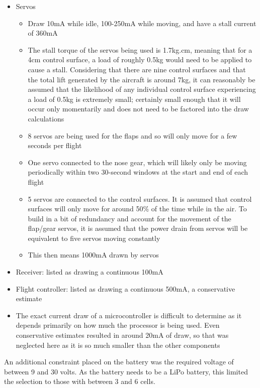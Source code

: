 \documentclass[../../main.tex]{subfiles}
\begin{document}
\begin{itemize}
    \item Servos
        \begin{itemize}
            \item Draw 10mA while idle, 100-250mA while moving, and have a stall current of 360mA 
            \item The stall torque of the servos being used is 1.7kg.cm, meaning that for a 4cm control surface, a load of roughly 0.5kg would need to be applied to cause a stall.
                Considering that there are nine control surfaces and that the total lift generated by the aircraft is around 7kg, it can reasonably be assumed that the likelihood of any individual control surface experiencing a load of 0.5kg is extremely small; certainly small enough that it will occur only momentarily and does not need to be factored into the draw calculations 
            \item 8 servos are being used for the flaps and so will only move for a few seconds per flight 
            \item One servo connected to the nose gear, which will likely only be moving periodically within two 30-second windows at the start and end of each flight 
            \item 5 servos are connected to the control surfaces.
                It is assumed that control surfaces will only move for around 50\% of the time while in the air.
                To build in a bit of redundancy and account for the movement of the flap/gear servos, it is assumed that the power drain from servos will be equivalent to five servos moving constantly 
            \item This then means 1000mA drawn by servos 
        \end{itemize}
    \item Receiver: listed as drawing a continuous 100mA 
    \item Flight controller: listed as drawing a continuous 500mA, a conservative estimate 
    \item The exact current draw of a microcontroller is difficult to determine as it depends primarily on how much the processor is being used.
        Even conservative estimates resulted in around 20mA of draw, so that was neglected here as it is so much smaller than the other components 
\end{itemize}

An additional constraint placed on the battery was the required voltage of between 9 and 30 volts.  As the battery needs to be a LiPo battery, this limited the selection to those with between 3 and 6 cells. 
\end{document}
